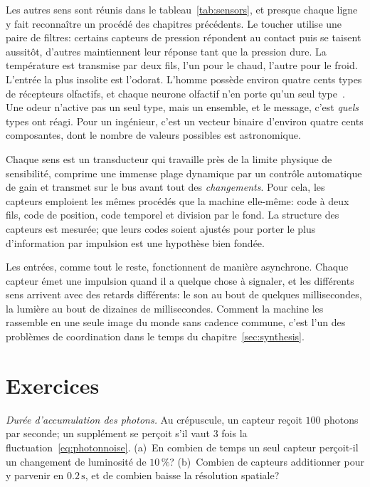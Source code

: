 Les autres sens sont réunis dans le tableau~\ref{tab:sensors}, et presque chaque ligne y fait reconnaître un procédé des chapitres précédents. Le toucher utilise une paire de filtres: certains capteurs de pression répondent au contact puis se taisent aussitôt, d'autres maintiennent leur réponse tant que la pression dure. La température est transmise par deux fils, l'un pour le chaud, l'autre pour le froid. L'entrée la plus insolite est l'odorat. L'homme possède environ quatre cents types de récepteurs olfactifs, et chaque neurone olfactif n'en porte qu'un seul type~\cite{Mombaerts2004}. Une odeur n'active pas un seul type, mais un ensemble, et le message, c'est \emph{quels} types ont réagi. Pour un ingénieur, c'est un vecteur binaire d'environ quatre cents composantes, dont le nombre de valeurs possibles est astronomique.

\begin{keyblock}
\begin{proposition}
\label{prop:sensors}
Chaque sens est un transducteur qui travaille près de la limite physique de sensibilité, comprime une immense plage dynamique par un contrôle automatique de gain et transmet sur le bus  avant tout des \emph{changements}. Pour cela, les capteurs emploient les mêmes procédés que la machine elle-même: code à deux fils, code de position, code temporel et division par le fond. La structure des capteurs est mesurée; que leurs codes soient ajustés pour porter le plus d'information par impulsion est une hypothèse bien fondée.
\end{proposition}
\end{keyblock}

Les entrées, comme tout le reste, fonctionnent de manière asynchrone. Chaque capteur émet une impulsion quand il a quelque chose à signaler, et les différents sens arrivent avec des retards différents: le son au bout de quelques millisecondes, la lumière au bout de dizaines de millisecondes. Comment la machine les rassemble en une seule image du monde sans cadence commune, c'est l'un des problèmes de coordination dans le temps du chapitre~\ref{sec:synthesis}.

\section{Exercices}

\begin{exercise}[\lvlA]
\label{ex:11:1}
\emph{Durée d'accumulation des photons.} Au crépuscule, un capteur reçoit $100$ photons par seconde; un supplément se perçoit s'il vaut $3$ fois la fluctuation~\eqref{eq:photonnoise}. (a)~En combien de temps un seul capteur perçoit-il un changement de luminosité de $10\,\%$? (b)~Combien de capteurs additionner pour y parvenir en $0.2\,\text{s}$, et de combien baisse la résolution spatiale?
\end{exercise}

